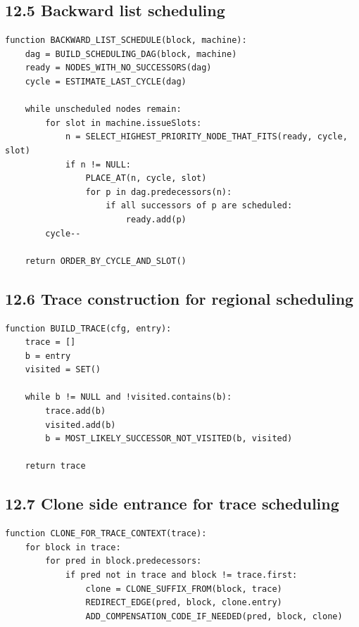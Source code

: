 \documentclass[10pt,letterpaper]{article}
\begin{document}
\subsection*{12.5 Backward list scheduling}

\begin{verbatim}
function BACKWARD_LIST_SCHEDULE(block, machine):
    dag = BUILD_SCHEDULING_DAG(block, machine)
    ready = NODES_WITH_NO_SUCCESSORS(dag)
    cycle = ESTIMATE_LAST_CYCLE(dag)

    while unscheduled nodes remain:
        for slot in machine.issueSlots:
            n = SELECT_HIGHEST_PRIORITY_NODE_THAT_FITS(ready, cycle, slot)
            if n != NULL:
                PLACE_AT(n, cycle, slot)
                for p in dag.predecessors(n):
                    if all successors of p are scheduled:
                        ready.add(p)
        cycle--

    return ORDER_BY_CYCLE_AND_SLOT()
\end{verbatim}

\subsection*{12.6 Trace construction for regional scheduling}

\begin{verbatim}
function BUILD_TRACE(cfg, entry):
    trace = []
    b = entry
    visited = SET()

    while b != NULL and !visited.contains(b):
        trace.add(b)
        visited.add(b)
        b = MOST_LIKELY_SUCCESSOR_NOT_VISITED(b, visited)

    return trace
\end{verbatim}

\subsection*{12.7 Clone side entrance for trace scheduling}

\begin{verbatim}
function CLONE_FOR_TRACE_CONTEXT(trace):
    for block in trace:
        for pred in block.predecessors:
            if pred not in trace and block != trace.first:
                clone = CLONE_SUFFIX_FROM(block, trace)
                REDIRECT_EDGE(pred, block, clone.entry)
                ADD_COMPENSATION_CODE_IF_NEEDED(pred, block, clone)
\end{verbatim}
\end{document}
